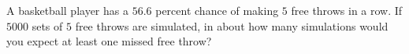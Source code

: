 A basketball player has a $56.6$ percent chance of making $5$ free throws in a row. If $5000$ sets of $5$ free throws are simulated, in about how many simulations would you expect at least one missed free throw?
